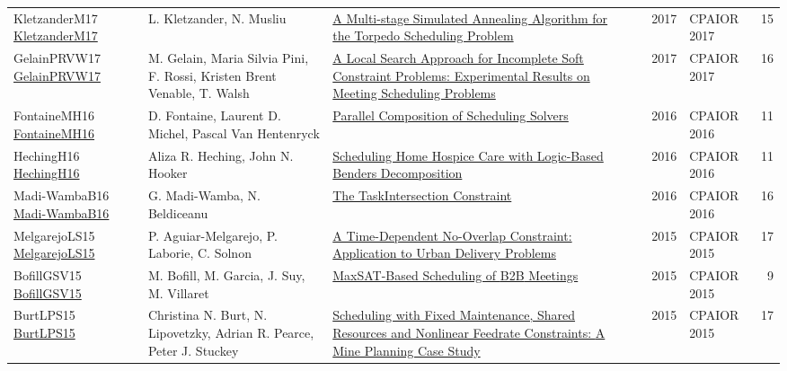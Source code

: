 {\begin{longtable}{p{3cm}p{6cm}p{7cm}rrrp{3cm}r}
KletzanderM17 \href{https://doi.org/10.1007/978-3-319-59776-8\_28}{KletzanderM17} & L. Kletzander, N. Musliu & \href{papers/KletzanderM17.pdf}{A Multi-stage Simulated Annealing Algorithm for the Torpedo Scheduling Problem} &  & \cite{KletzanderM17} & 2017 & CPAIOR 2017 & 15\\
GelainPRVW17 \href{https://doi.org/10.1007/978-3-319-59776-8\_32}{GelainPRVW17} & M. Gelain, Maria Silvia Pini, F. Rossi, Kristen Brent Venable, T. Walsh & \href{papers/GelainPRVW17.pdf}{A Local Search Approach for Incomplete Soft Constraint Problems: Experimental Results on Meeting Scheduling Problems} &  & \cite{GelainPRVW17} & 2017 & CPAIOR 2017 & 16\\
FontaineMH16 \href{https://doi.org/10.1007/978-3-319-33954-2\_12}{FontaineMH16} & D. Fontaine, Laurent D. Michel, Pascal Van Hentenryck & \href{papers/FontaineMH16.pdf}{Parallel Composition of Scheduling Solvers} &  & \cite{FontaineMH16} & 2016 & CPAIOR 2016 & 11\\
HechingH16 \href{https://doi.org/10.1007/978-3-319-33954-2\_14}{HechingH16} & Aliza R. Heching, John N. Hooker & \href{papers/HechingH16.pdf}{Scheduling Home Hospice Care with Logic-Based Benders Decomposition} &  & \cite{HechingH16} & 2016 & CPAIOR 2016 & 11\\
Madi-WambaB16 \href{https://doi.org/10.1007/978-3-319-33954-2\_18}{Madi-WambaB16} & G. Madi{-}Wamba, N. Beldiceanu & \href{papers/Madi-WambaB16.pdf}{The TaskIntersection Constraint} &  & \cite{Madi-WambaB16} & 2016 & CPAIOR 2016 & 16\\
MelgarejoLS15 \href{https://doi.org/10.1007/978-3-319-18008-3\_1}{MelgarejoLS15} & P. Aguiar{-}Melgarejo, P. Laborie, C. Solnon & \href{papers/MelgarejoLS15.pdf}{A Time-Dependent No-Overlap Constraint: Application to Urban Delivery Problems} &  & \cite{MelgarejoLS15} & 2015 & CPAIOR 2015 & 17\\
BofillGSV15 \href{https://doi.org/10.1007/978-3-319-18008-3\_5}{BofillGSV15} & M. Bofill, M. Garcia, J. Suy, M. Villaret & \href{papers/BofillGSV15.pdf}{MaxSAT-Based Scheduling of {B2B} Meetings} &  & \cite{BofillGSV15} & 2015 & CPAIOR 2015 & 9\\
BurtLPS15 \href{https://doi.org/10.1007/978-3-319-18008-3\_7}{BurtLPS15} & Christina N. Burt, N. Lipovetzky, Adrian R. Pearce, Peter J. Stuckey & \href{papers/BurtLPS15.pdf}{Scheduling with Fixed Maintenance, Shared Resources and Nonlinear Feedrate Constraints: {A} Mine Planning Case Study} &  & \cite{BurtLPS15} & 2015 & CPAIOR 2015 & 17\\

\end{longtable}}
